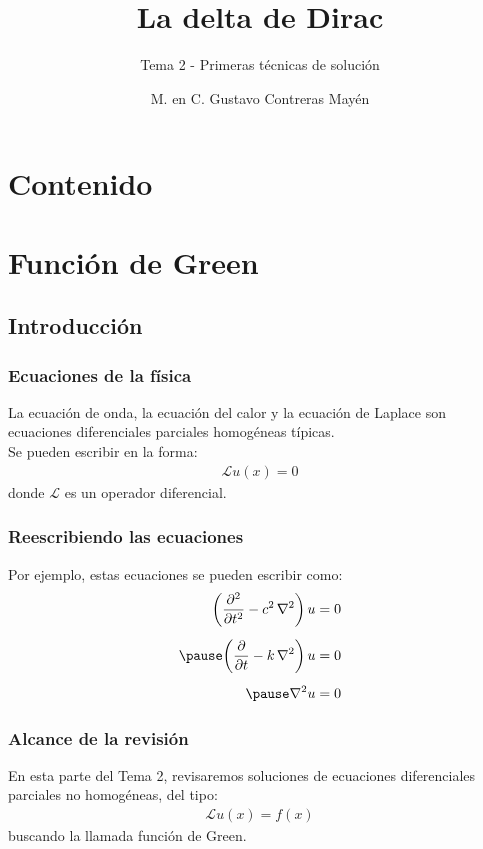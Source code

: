 \documentclass[12pt]{beamer}
\date{}
\title{\large{La delta de Dirac}}
\subtitle{Tema 2 - Primeras técnicas de solución}
\author{M. en C. Gustavo Contreras Mayén}
\begin{document}
\maketitle
\fontsize{14}{14}\selectfont
{}

\section*{Contenido}

\section{Función de Green}
\subsection{Introducción}

\begin{frame}
\frametitle{Ecuaciones de la física}
La ecuación de onda, la ecuación del calor y la ecuación de Laplace son ecuaciones diferenciales parciales homogéneas típicas.
\\
\bigskip
\pause
Se pueden escribir en la forma:
\pause
\begin{align*}
\mathcal{L} u (x) = 0
\end{align*}
donde $\mathcal{L}$ es un operador diferencial.
\end{frame}
\begin{frame}
\frametitle{Reescribiendo las ecuaciones}
Por ejemplo, estas ecuaciones se pueden escribir como:
\pause
\begin{eqnarray*}
\begin{aligned}
\bigg( \pdv[2]{t} - c^{2} \, \laplacian \bigg) \, u &= 0 \\[0.5em] \pause
\bigg( \pdv{t} - k \, \laplacian \bigg) \, u &= 0 \\[0.5em] \pause
\laplacian{u} &= 0
\end{aligned}
\end{eqnarray*}
\end{frame}

\begin{frame}
\frametitle{Alcance de la revisión}
En esta parte del Tema  2, revisaremos soluciones de ecuaciones diferenciales parciales no homogéneas, del tipo:
\pause
\begin{align*}
\mathcal{L} u (x) = f (x)
\end{align*}
buscando la llamada función de Green. 
\end{frame}
\end{document}
